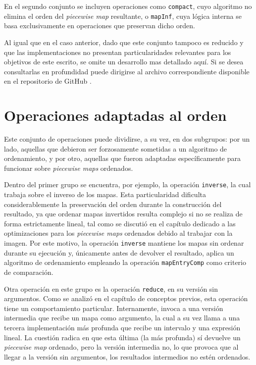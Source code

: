 En el segundo conjunto se incluyen operaciones como \texttt{compact}, cuyo algoritmo no elimina el orden del \textit{piecewise map} resultante, o \texttt{mapInf}, cuya lógica interna se basa exclusivamente en operaciones que preservan dicho orden.

Al igual que en el caso anterior, dado que este conjunto tampoco es reducido y que las implementaciones no presentan particularidades relevantes para los objetivos de este escrito, se omite un desarrollo mas detallado aquí. Si se desea consultarlas en profundidad puede dirigirse al archivo correspondiente disponible en el repositorio de GitHub \cite{sbg}.

\section{Operaciones adaptadas al orden}

Este conjunto de operaciones puede dividirse, a su vez, en dos subgrupos: por un lado, aquellas que debieron ser forzosamente sometidas a un algoritmo de ordenamiento, y por otro, aquellas que fueron adaptadas específicamente para funcionar sobre \textit{piecewise maps} ordenados.

Dentro del primer grupo se encuentra, por ejemplo, la operación \texttt{inverse}, la cual trabaja sobre el inverso de los mapas. Esta particularidad dificulta considerablemente la preservación del orden durante la construcción del resultado, ya que ordenar mapas invertidos resulta complejo si no se realiza de forma estrictamente lineal, tal como se discutió en el capítulo dedicado a las optimizaciones para los \textit{piecewise maps} ordenados debido al trabajar con la imagen. Por este motivo, la operación \texttt{inverse} mantiene los mapas sin ordenar durante su ejecución y, únicamente antes de devolver el resultado, aplica un algoritmo de ordenamiento empleando la operación \texttt{mapEntryComp} como criterio de comparación.


Otra operación en este grupo es la operación \texttt{reduce}, en su versión sin argumentos. Como se analizó en el capítulo de conceptos previos, esta operación tiene un comportamiento particular. Internamente, invoca a una versión intermedia que recibe un mapa como argumento, la cual a su vez llama a una tercera implementación más profunda que recibe un intervalo y una expresión lineal. La cuestión radica en que esta última (la más profunda) sí devuelve un \textit{piecewise map} ordenado, pero la versión intermedia no, lo que provoca que al llegar a la versión sin argumentos, los resultados intermedios no estén ordenados.

